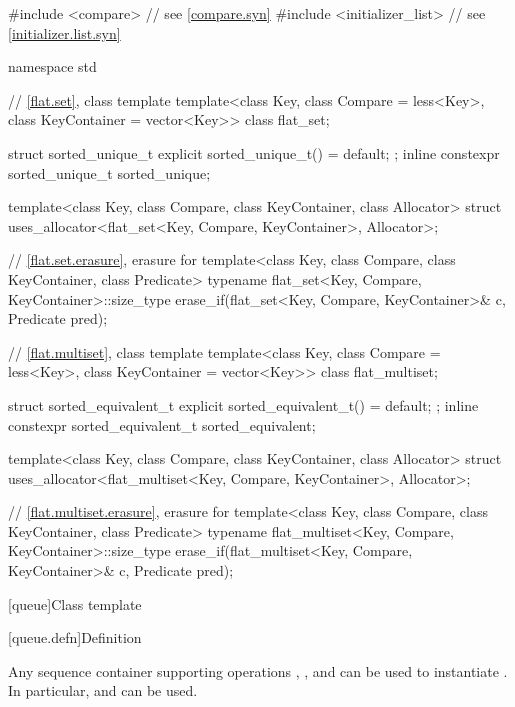 \begin{codeblock}
#include <compare>              // see \ref{compare.syn}
#include <initializer_list>     // see \ref{initializer.list.syn}

namespace std {
  // \ref{flat.set}, class template 
  template<class Key, class Compare = less<Key>, class KeyContainer = vector<Key>>
    class flat_set;

  struct sorted_unique_t { explicit sorted_unique_t() = default; };
  inline constexpr sorted_unique_t sorted_unique{};

  template<class Key, class Compare, class KeyContainer, class Allocator>
    struct uses_allocator<flat_set<Key, Compare, KeyContainer>, Allocator>;

  // \ref{flat.set.erasure}, erasure for 
  template<class Key, class Compare, class KeyContainer, class Predicate>
    typename flat_set<Key, Compare, KeyContainer>::size_type
      erase_if(flat_set<Key, Compare, KeyContainer>& c, Predicate pred);

  // \ref{flat.multiset}, class template 
  template<class Key, class Compare = less<Key>, class KeyContainer = vector<Key>>
    class flat_multiset;

  struct sorted_equivalent_t { explicit sorted_equivalent_t() = default; };
  inline constexpr sorted_equivalent_t sorted_equivalent{};

  template<class Key, class Compare, class KeyContainer, class Allocator>
    struct uses_allocator<flat_multiset<Key, Compare, KeyContainer>, Allocator>;

  // \ref{flat.multiset.erasure}, erasure for 
  template<class Key, class Compare, class KeyContainer, class Predicate>
    typename flat_multiset<Key, Compare, KeyContainer>::size_type
      erase_if(flat_multiset<Key, Compare, KeyContainer>& c, Predicate pred);
}
\end{codeblock}

[queue]{Class template }

[queue.defn]{Definition}

\pnum
{}%
Any sequence container supporting operations
,
,
and
can be used to instantiate
.
In particular,
and
can be used.

